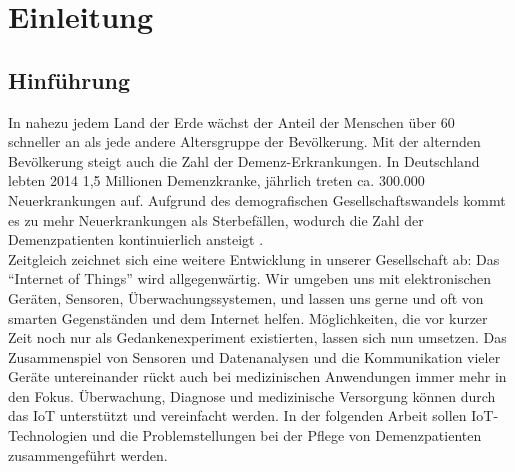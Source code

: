 
\section{Einleitung}
\subsection{Hinführung}
In nahezu jedem Land der Erde wächst der Anteil der Menschen über 60 schneller an als jede andere Altersgruppe der Bevölkerung. Mit der alternden Bevölkerung steigt auch die Zahl der Demenz-Erkrankungen. In Deutschland lebten 2014 1,5 Millionen Demenzkranke, jährlich treten ca. 300.000 Neuerkrankungen auf. Aufgrund des demografischen Gesellschaftswandels kommt es zu mehr Neuerkrankungen als Sterbefällen, wodurch die Zahl der Demenzpatienten kontinuierlich ansteigt \citep[Vgl.][]{demenz}.\\
Zeitgleich zeichnet sich eine weitere Entwicklung in unserer Gesellschaft ab: Das \enquote{Internet of Things} wird allgegenwärtig. Wir umgeben uns mit elektronischen Geräten, Sensoren, Überwachungssystemen, und lassen uns gerne und oft von smarten Gegenständen und dem Internet helfen. Möglichkeiten, die vor kurzer Zeit noch nur als Gedankenexperiment existierten, lassen sich nun umsetzen. Das Zusammenspiel von Sensoren und Datenanalysen und die Kommunikation vieler Geräte untereinander rückt auch bei medizinischen Anwendungen immer mehr in den Fokus. Überwachung, Diagnose und medizinische Versorgung können durch das IoT unterstützt und vereinfacht werden. In der folgenden Arbeit sollen IoT-Technologien und die Problemstellungen bei der Pflege von Demenzpatienten zusammengeführt werden.
